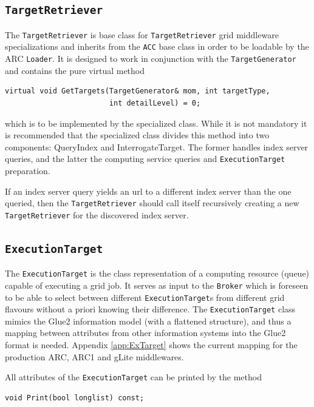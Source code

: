 \documentclass{book}
\newcommand{\Broker}{\texttt{Broker}}
\newcommand{\ExecutionTarget}{\texttt{ExecutionTarget}}
\newcommand{\TargetGenerator}{\texttt{TargetGenerator}}
\newcommand{\TargetRetriever}{\texttt{TargetRetriever}}
\begin{document}
\subsection{{\TargetRetriever}}

The {\TargetRetriever} is base class for {\TargetRetriever} grid
middleware specializations and inherits from the \texttt{ACC} base
class in order to be loadable by the ARC \texttt{Loader}. It is
designed to work in conjunction with the {\TargetGenerator} and
contains the pure virtual method

\begin{shaded}
\begin{verbatim}
virtual void GetTargets(TargetGenerator& mom, int targetType,
                        int detailLevel) = 0;
\end{verbatim}
\end{shaded}

which is to be implemented by the specialized class. While it is not
mandatory it is recommended that the specialized class divides this
method into two components: QueryIndex and InterrogateTarget. The
former handles index server queries, and the latter the computing
service queries and {\ExecutionTarget} preparation.

If an index server query yields an url to a different index server
than the one queried, then the {\TargetRetriever} should call itself
recursively creating a new {\TargetRetriever} for the discovered index
server.

\subsection{{\ExecutionTarget}}

The {\ExecutionTarget} is the class representation of a computing
resource (queue) capable of executing a grid job. It serves as input
to the {\Broker} which is foreseen to be able to select between
different {\ExecutionTarget}s from different grid flavours without a
priori knowing their difference. The {\ExecutionTarget} class mimics
the Glue2 information model (with a flattened structure), and thus a
mapping between attributes from other information systems into the
Glue2 format is needed. Appendix \ref{app:ExTarget} shows the current
mapping for the production ARC, ARC1 and gLite middlewares.

All attributes of the {\ExecutionTarget} can be printed by the method

\begin{shaded}
\begin{verbatim}
void Print(bool longlist) const;
\end{verbatim}
\end{shaded}
\end{document}
